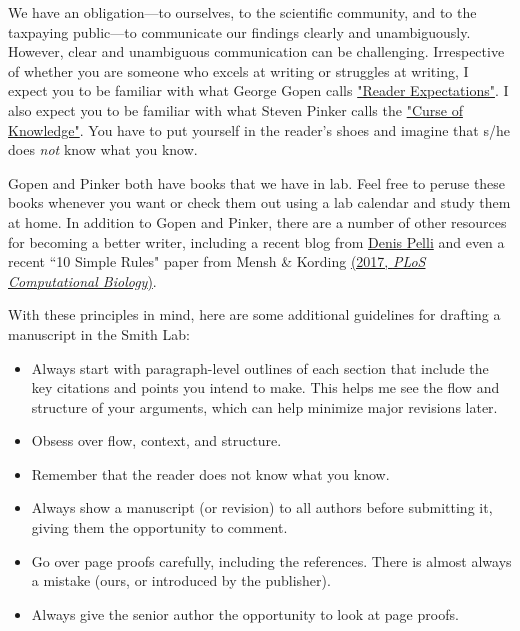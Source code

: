 \documentclass[letterpaper,12pt,oneside]{memoir}
\begin{document}
We have an obligation---to ourselves, to the scientific community, and to the taxpaying public---to communicate our findings clearly and unambiguously. However, clear and unambiguous communication can be challenging. Irrespective of whether you are someone who excels at writing or struggles at writing, I expect you to be familiar with what George Gopen calls \href{https://cseweb.ucsd.edu/~swanson/papers/science-of-writing.pdf}{"Reader Expectations"}. I also expect you to be familiar with what Steven Pinker calls the \href{https://stevenpinker.com/files/pinker/files/why_academics_stink_at_writing.pdf}{"Curse of Knowledge"}. You have to put yourself in the reader's shoes and imagine that s/he does \textit{not} know what you know. 

Gopen and Pinker both have books that we have in lab. Feel free to peruse these books whenever you want or check them out using a lab calendar and study them at home. In addition to Gopen and Pinker, there are a number of other resources for becoming a better writer, including a recent blog from \href{http://psych.nyu.edu/pelli/style.html}{Denis Pelli} and even a recent ``10 Simple Rules" paper from Mensh \& Kording \href{http://journals.plos.org/ploscompbiol/article?id=10.1371/journal.pcbi.1005619}{(2017, \textit{PLoS Computational Biology})}.

With these principles in mind, here are some additional guidelines for drafting a manuscript in the Smith Lab:

\begin{itemize}
\item Always start with paragraph-level outlines of each section that include the key citations and points you intend to make. This helps me see the flow and structure of your arguments, which can help minimize major revisions later. 
\item Obsess over flow, context, and structure.
\item Remember that the reader does not know what you know.
\item Always show a manuscript (or revision) to all authors before submitting it, giving them the opportunity to comment.
\item Go over page proofs carefully, including the references. There is almost always a mistake (ours, or introduced by the publisher).
\item Always give the senior author the opportunity to look at page proofs.
\end{itemize}
\end{document}
